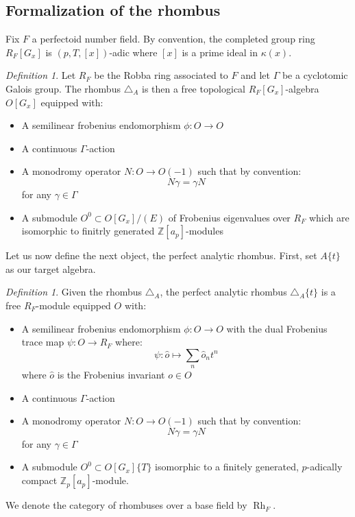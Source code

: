 \documentclass[9pt]{amsart}
\renewcommand{\[}{\begin{equation}}
\renewcommand{\]}{\end{equation}}
\newcommand{\on}{\operatorname}
\theoremstyle{plain}
\theoremstyle{remark}
\newtheorem{defin}[thm]{Definition}
\begin{document}
\subsection{Formalization of the rhombus} Fix $F$ a perfectoid number field.
By convention, the completed group ring $R_F[G_x]$ is $(p, T, [x])$-adic where $[x]$ is a prime ideal in $\kappa(x)$.
\begin{defin}
Let $R_F$ be the Robba ring associated to $F$ and let $\Gamma$ be a cyclotomic Galois group. The rhombus $\triangle_A$ is then a free topological $R_F[G_x]$-algebra $O[G_x]$ equipped with:
\begin{itemize}
\item A semilinear frobenius endomorphism $\phi: O \to O$
\item A continuous $\Gamma$-action 
\item A monodromy operator $N: O \to O(-1)$ such that by convention: \[N\gamma = \gamma N\] for any $\gamma \in \Gamma$
\item A submodule $O^0 \subset O[G_x]/(E)$ of Frobenius eigenvalues over $R_F$ which are isomorphic to finitrly generated $\mathbb{Z}[a_p]$-modules
\end{itemize}
\end{defin}
Let us now define the next object, the perfect analytic rhombus. First, set $A \{ t \}$ as our target algebra. 
\begin{defin}
Given the rhombus $\triangle_A$, the perfect analytic rhombus $\triangle_A\{t\}$ is a free $R_F$-module equipped $O$ with:
\begin{itemize}
\item A semilinear frobenius endomorphism $\phi: O \to O$ with the dual Frobenius trace map $\psi: O \to R_F$ where:
\[\psi: \hat{o} \mapsto \sum_n \hat{o}_n t^n\] where $\hat{o}$ is the Frobenius invariant $o \in O$
\item A continuous $\Gamma$-action 
\item A monodromy operator $N: O \to O(-1)$ such that by convention: \[N\gamma = \gamma N\] for any $\gamma \in \Gamma$
\item A submodule $O^0 \subset O[G_x]\{T\}$ isomorphic to a finitely generated, $p$-adically compact $\mathbb{Z}_p[a_p]$-module.
\end{itemize}
\end{defin}
We denote the category of rhombuses over a base field by $\on{Rh}_F$.
\end{document}
